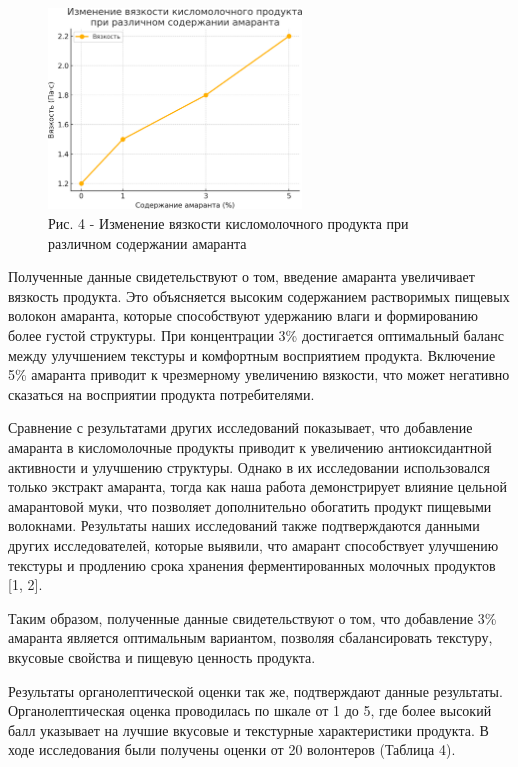 \begin{figure}[H]
	\centering
	\includegraphics[width=0.6\textwidth]{media/pish2/image23}
	\caption*{Рис. 4 - Изменение вязкости кисломолочного продукта при различном содержании амаранта}
\end{figure}

\begin{multicols}{2}
Полученные данные свидетельствуют о том, введение амаранта увеличивает
вязкость продукта. Это объясняется высоким содержанием растворимых
пищевых волокон амаранта, которые способствуют удержанию влаги и
формированию более густой структуры. При концентрации 3\% достигается
оптимальный баланс между улучшением текстуры и комфортным восприятием
продукта. Включение 5\% амаранта приводит к чрезмерному увеличению
вязкости, что может негативно сказаться на восприятии продукта
потребителями.

Сравнение с результатами других исследований показывает, что добавление
амаранта в кисломолочные продукты приводит к увеличению антиоксидантной
активности и улучшению структуры. Однако в их исследовании использовался
только экстракт амаранта, тогда как наша работа демонстрирует влияние
цельной амарантовой муки, что позволяет дополнительно обогатить продукт
пищевыми волокнами. Результаты наших исследований также подтверждаются
данными других исследователей, которые выявили, что амарант способствует
улучшению текстуры и продлению срока хранения ферментированных молочных
продуктов {[}1, 2{]}.

Таким образом, полученные данные свидетельствуют о том, что добавление
3\% амаранта является оптимальным вариантом, позволяя сбалансировать
текстуру, вкусовые свойства и пищевую ценность продукта.

Результаты органолептической оценки так же, подтверждают данные
результаты. Органолептическая оценка проводилась по шкале от 1 до 5, где
более высокий балл указывает на лучшие вкусовые и текстурные
характеристики продукта. В ходе исследования были получены оценки от 20
волонтеров (Таблица 4).
\end{multicols}

